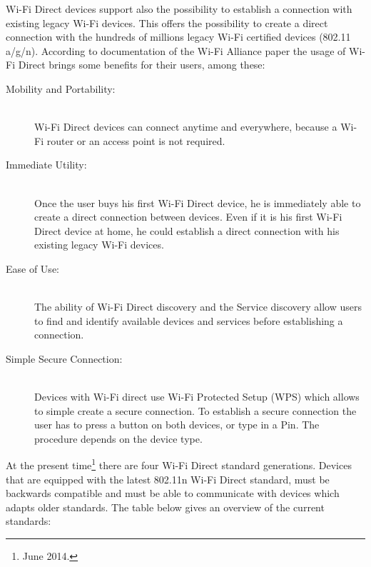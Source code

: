 Wi-Fi Direct devices support also the possibility to establish a connection with existing legacy Wi-Fi devices. This offers the possibility to create a direct connection with the hundreds of millions legacy Wi-Fi certified devices (802.11 a/g/n). According to documentation of the Wi-Fi Alliance paper the usage of Wi-Fi Direct brings some benefits for their users, among these:\\
\begin{description}
  \item[Mobility and Portability:] \hfill \\ Wi-Fi Direct devices can connect anytime and everywhere, because a Wi-Fi router or an access point is not required\cite{wifialliance}.
  \item[Immediate Utility:] \hfill \\ Once the user buys his first Wi-Fi Direct device, he is immediately able to create a direct connection between devices. Even if it is his first Wi-Fi Direct device at home, he could establish a direct connection with his existing legacy Wi-Fi devices\cite{wifialliance}.
  \item[Ease of Use:] \hfill \\ The ability of Wi-Fi Direct discovery and the Service discovery allow users to find and identify available devices and services before establishing a connection\cite{wifialliance}.
  \item[Simple Secure Connection:] \hfill \\ Devices with Wi-Fi direct use Wi-Fi Protected Setup (WPS) which allows to simple create a secure connection. To establish a secure connection the user has to press a button on both devices, or type in a Pin. The procedure depends on the device type\cite{wifialliance}.\\
\end{description}

\noindent At the present time\footnote{\label{foot:1}June 2014.} there are four Wi-Fi Direct standard generations. Devices that are equipped with the latest 802.11n Wi-Fi Direct standard, must be backwards compatible and must be able to communicate with devices which adapts older standards. The table below gives an overview of the current standards:

